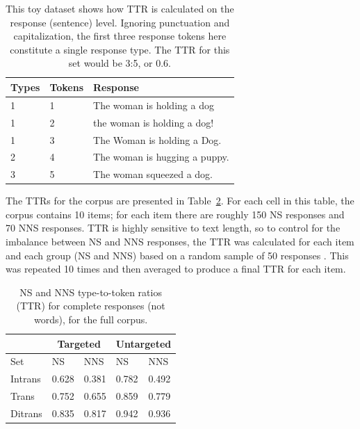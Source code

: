 \begin{table}[htb!]
\begin{center}
\begin{tabular}{|l|l|l|}
\hline
Types & Tokens & Response \\
\hline
1 & 1 & The woman is holding a dog \\
\hline
1 & 2 & the woman is holding a dog! \\
\hline
1 & 3 & The Woman is holding a Dog. \\
\hline
2 & 4 & The woman is hugging a puppy. \\
\hline
3 & 5 & The woman squeezed a dog. \\
\hline
\end{tabular}
\caption{\label{tab:type-token-examples} This toy dataset shows how TTR is calculated on the response (sentence) level. Ignoring punctuation and capitalization, the first three response tokens here constitute a single response type. The TTR for this set would be 3:5, or 0.6.}
\end{center}
\end{table}


The TTRs for the corpus are presented in Table~\ref{tab:ttr}. 
For each cell in this table, the corpus contains 10 items; for each item there are roughly 150 NS responses and 70 NNS responses. 
TTR is highly sensitive to text length, so to control for the imbalance between NS and NNS responses, the TTR was calculated for each item and each group (NS and NNS) based on a random sample of 50 responses \citep{grieve2007}.  This was repeated 10 times and then averaged to produce a final TTR for each item.

\begin{table}[h!]
\begin{center}
\begin{tabular}{|l||l|l||l|l|}
\hline
 & \multicolumn{2}{|c||}{Targeted} & \multicolumn{2}{|c|}{Untargeted} \\
\hline
 Set & NS & NNS & NS & NNS \\
\hline
\hline
Intrans & 0.628 & 0.381 & 0.782 & 0.492 \\
\hline
Trans & 0.752 & 0.655 & 0.859 & 0.779 \\ %
\hline
Ditrans & 0.835 & 0.817 & 0.942 & 0.936 \\ 
\hline
\end{tabular}
\caption{\label{tab:ttr} NS and NNS type-to-token ratios (TTR) for complete responses (not words), for the full corpus.}
\end{center}
\end{table}

